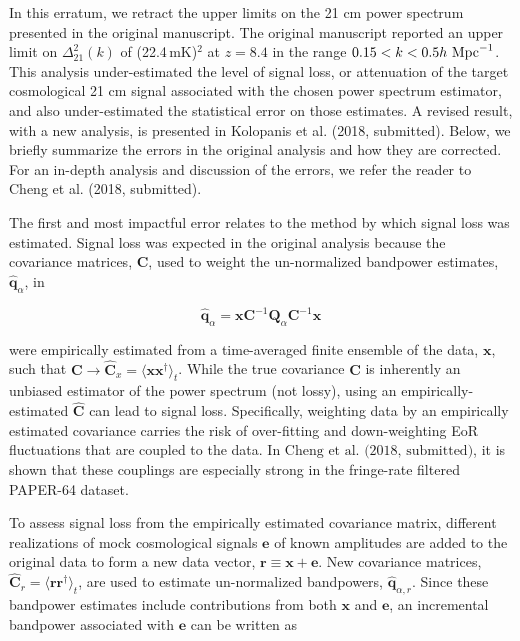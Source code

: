 \documentclass[onecolumn]{emulateapj} \shorttitle{}
\newcommand{\hMpci}{h\ {\rm Mpc}^{-1}}
\newcommand{\mKlimit}{(22.4\,\textrm{mK})$^2$ }
\newcommand{\kolopaniscitet}{\textrm{Kolopanis et al. (2018, submitted)}}
\newcommand{\chengcitet}{\textrm{Cheng et al. (2018, submitted)}}
\begin{document}
\maketitle

In this erratum, we retract the upper limits on the 21 cm power spectrum
presented in the original manuscript.  The original manuscript reported an upper
limit on $\Delta_{21}^2(k)$ of \mKlimit at $z=8.4$ in the range
$0.15<k<0.5\hMpci$.  This analysis under-estimated the level of signal loss, or attenuation of
the target cosmological 21 cm signal associated with the chosen power spectrum
estimator, and also under-estimated the statistical error on those estimates.
A revised result, with a new analysis, is presented in \kolopaniscitet.  Below,
we briefly summarize the errors in the original analysis and how they are
corrected. For an in-depth analysis and discussion of the errors, we refer the reader to
\chengcitet.

The first and most impactful error relates to the method by which signal loss
was estimated. Signal loss was expected in the original analysis because the
covariance matrices, $\textbf{C}$, used to weight the un-normalized bandpower
estimates, ${\widehat{\textbf{q}}}_\alpha$, in

\begin{equation}
{\widehat{\textbf{q}}}_{\alpha} = {\mathbf x}\textbf{C}^{-1}\textbf{Q}_\alpha \textbf{C}^{-1}{\mathbf x}
\end{equation} 

were empirically estimated from a time-averaged finite ensemble of the data,
$\mathbf x$, such that $\mathbf{C}\rightarrow \widehat{\textbf{C}}_{x}=\langle {\mathbf x} {\mathbf x}^\dagger\rangle_{t}$.
While the true covariance $\textbf{C}$ is inherently an unbiased estimator of the power spectrum (not lossy), using an empirically-estimated $\widehat{\textbf{C}}$ can lead to signal loss. Specifically, weighting data by an empirically estimated covariance carries the risk of over-fitting and down-weighting EoR fluctuations that are coupled to the data. In $\chengcitet$, it is shown that these couplings are especially strong in the fringe-rate filtered PAPER-64 dataset.

To assess signal loss from the empirically estimated covariance matrix, different realizations of mock
cosmological signals $\mathbf e$ of known amplitudes are added to the original data to form a new data vector, 
${\mathbf r}\equiv{\mathbf x} + {\mathbf e}$.
New covariance matrices, 
$\widehat{\textbf{C}}_r=\langle{\mathbf r}\mathbf{r}^\dagger\rangle_{t}$, 
are used to estimate un-normalized bandpowers, 
${\widehat{\textbf{q}}}_{\alpha,r}$. 
Since these bandpower estimates include contributions from both $\mathbf x$ and
$\mathbf e$, an incremental bandpower associated with $\mathbf e$ can be
written as
\end{document}
